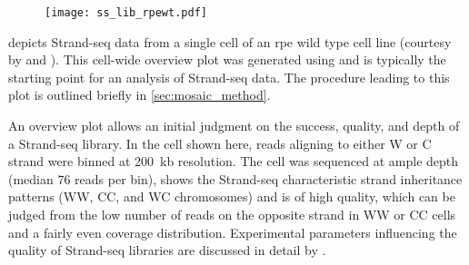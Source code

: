     \begin{figure}[t!]                                             %
        \captionsetup{type=figure}
        \texttt{[image: ss\_lib\_rpewt.pdf]}
    \end{figure}

 depicts Strand-seq data from a single cell of an \acf{rpe}
wild type cell line (courtesy by \balca and \landsdorp). This cell-wide overview
plot was generated using \mc and is typically the starting point for
an analysis of Strand-seq data. The procedure leading to this plot is outlined
briefly in \cref{sec:mosaic_method}.

An overview plot allows an initial judgment on the success, quality, and depth
of a Strand-seq library. In the cell shown here, reads aligning to either W or C
strand were binned at 200~kb resolution. The cell was sequenced at ample depth
(median 76 reads per bin), shows the Strand-seq characteristic strand
inheritance patterns (WW, CC, and WC chromosomes) and is of high quality, which
can be judged from the low number of reads on the opposite strand in WW or CC
cells and a fairly even coverage distribution. Experimental parameters
influencing the quality of Strand-seq libraries are discussed in detail by
\cite{Sanders2017}.

